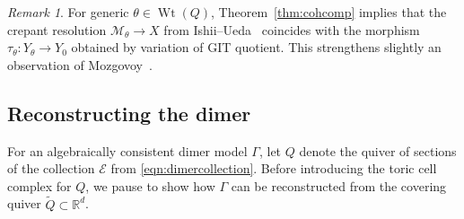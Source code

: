 \documentclass[11pt,a4paper]{amsart}
\numberwithin{equation}{section}
\theoremstyle{definition}
\theoremstyle{remark}
\newtheorem{remark}[theorem]{Remark}
\newcommand{\RR}{\ensuremath{\mathbb{R}}}
\newcommand{\Wt}{\operatorname{Wt}}
\begin{document}
 \begin{remark}
 \label{rem:dimerconclusion}
For generic $\theta\in \Wt(Q)$, Theorem~\ref{thm:cohcomp} implies that the crepant resolution $\mathcal{M}_\theta\to X$ from Ishii--Ueda~\cite{IshiiUeda1} coincides with the morphism $\tau_\theta\colon Y_\theta\to Y_0$ obtained by variation of GIT quotient. This strengthens slightly an observation of Mozgovoy~\cite[Proposition~4.4]{Mozgovoy}.\end{remark}


\subsection{Reconstructing the dimer}
For an algebraically consistent dimer model $\Gamma$, let $Q$ denote the quiver of sections of the collection $\mathscr{E}$ from \eqref{eqn:dimercollection}. Before introducing the toric cell complex for $Q$, we pause to show how $\Gamma$ can be reconstructed from the covering quiver $\widetilde{Q}\subset \RR^d$.
\end{document}
